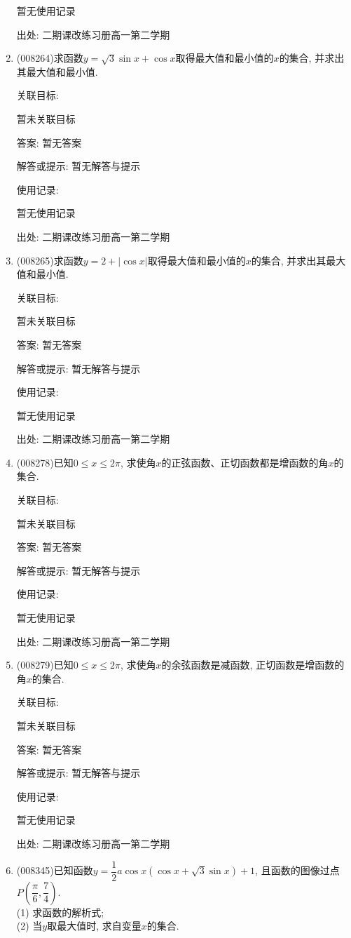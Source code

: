 \documentclass[10pt,a4paper]{article}
\begin{document}
\begin{enumerate}[1.]
暂无使用记录


出处: 二期课改练习册高一第二学期
\item { (008264)}求函数$y=\sqrt 3\sin x+\cos x$取得最大值和最小值的$x$的集合, 并求出其最大值和最小值.


关联目标:

暂未关联目标

答案: 暂无答案

解答或提示: 暂无解答与提示

使用记录:

暂无使用记录


出处: 二期课改练习册高一第二学期
\item { (008265)}求函数$y=2+|\cos x|$取得最大值和最小值的$x$的集合, 并求出其最大值和最小值.


关联目标:

暂未关联目标

答案: 暂无答案

解答或提示: 暂无解答与提示

使用记录:

暂无使用记录


出处: 二期课改练习册高一第二学期
\item { (008278)}已知$0\le x\le 2\pi$, 求使角$x$的正弦函数、正切函数都是增函数的角$x$的集合.


关联目标:

暂未关联目标

答案: 暂无答案

解答或提示: 暂无解答与提示

使用记录:

暂无使用记录


出处: 二期课改练习册高一第二学期
\item { (008279)}已知$0\le x\le 2\pi$, 求使角$x$的余弦函数是减函数, 正切函数是增函数的角$x$的集合.


关联目标:

暂未关联目标

答案: 暂无答案

解答或提示: 暂无解答与提示

使用记录:

暂无使用记录


出处: 二期课改练习册高一第二学期
\item { (008345)}已知函数$y=\dfrac 12a\cos x(\cos x+\sqrt 3\sin x)+1$, 且函数的图像过点$P(\dfrac{\pi}6,\dfrac 74)$.\\
(1) 求函数的解析式;\\
(2) 当$y$取最大值时, 求自变量$x$的集合.



\end{enumerate}
\end{document}
